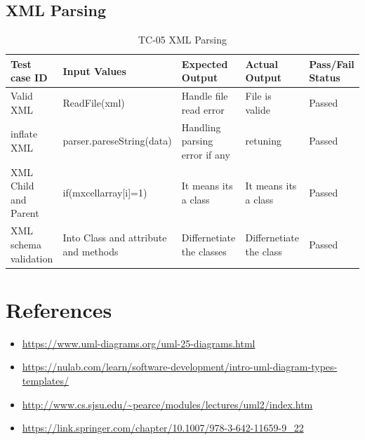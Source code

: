 \documentclass[12pt,a4paper]{article}
\begin{document}
     \subsection{XML Parsing}
    \begin{table}[h]
\caption{TC-05 XML Parsing}
    \centering
    \begin{tabular}{|p{9em}|p{9em}|p{4em}|p{4em}|p{4em}|}
    \hline
   \textbf{Test case ID}&\textbf{Input Values}&\textbf{Expected Output}
&\textbf{Actual Output}
&\textbf{Pass/Fail Status} \\%
       \hline
   Valid XML &ReadFile(xml)&Handle file read error&File is valide&Passed\\
    \hline
     inflate XML &parser.pareseString(data)&Handling parsing error if any&retuning&Passed\\
    \hline
    XML Child and Parent &if(mxcellarray[i]=1)&It means its a class&It means its a class&Passed\\
    \hline
    XML schema validation &Into Class and attribute and methods&Differnetiate the classes&Differnetiate the class&Passed\\
    \hline
    \end{tabular} 
    \end{table}
    \newpage
    \section{References}
    \begin{itemize}
        \item \url{https://www.uml-diagrams.org/uml-25-diagrams.html}
        \item \url{https://nulab.com/learn/software-development/intro-uml-diagram-types-templates/}
        \item \url{http://www.cs.sjsu.edu/~pearce/modules/lectures/uml2/index.htm}
        \item \url{https://link.springer.com/chapter/10.1007/978-3-642-11659-9_22}
    \end{itemize}








    
    
\end{document}
